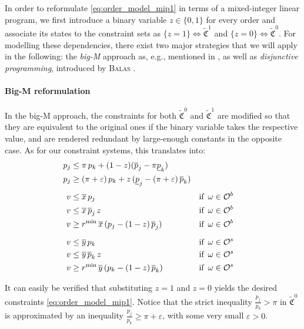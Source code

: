 \documentclass[11pt,parskip=full]{scrartcl}%
\newcommand*{\eg}{e.g., }
\newcommand*{\Min}{\mathrm{min}}
\newcommand*{\buyorders}{\mathcal{O}^b}     %
\newcommand*{\sellorders}{\mathcal{O}^s}    %
\begin{document}
In order to reformulate \eqref{eq:order_model_mip1} in terms of a mixed-integer linear program,
we first introduce a binary variable $ z \in \{0,1\} $ for every order and associate its states to
the constraint sets as $ \{z = 1\} \Leftrightarrow \tilde{\mathfrak{C}}^1 $ and
$ \{z = 0\} \Leftrightarrow \tilde{\mathfrak{C}}^0 $.
For modelling these dependencies, there exist two major strategies that we will apply in the
following:
the \emph{big-M} approach as, \eg mentioned in \cite{BONAMI-ET-AL_2015:indicator-constraints},
as well as \emph{disjunctive programming}, introduced by \textsc{Balas} \cite{BALAS_1979:DP}.

\paragraph{Big-M reformulation}

In the big-M approach, the constraints for both $ \tilde{\mathfrak{C}}^0 $ and
$ \tilde{\mathfrak{C}}^1 $ are modified so that they are equivalent to the original ones if the
binary variable takes the respective value, and are rendered redundant by large-enough constants in
the opposite case.
As for our constraint systems, this translates into:
\begin{subequations}
\begin{align}
  p_j &\le \pi \, p_k + (1-z) (\overline{p}_j - \pi \underline{p}_k) \\
  p_j &\ge (\pi+\varepsilon) \, p_k
    + z \, (\underline{p}_j - (\pi+\varepsilon) \, \overline{p}_k) \\[1mm]
  v &\le \overline{x} \, p_j
    && \text{if} \enskip \omega \in \buyorders \\
  v &\le \overline{x} \, \overline{p}_j \, z
    && \text{if} \enskip \omega \in \buyorders \\
  v &\ge r^\Min \, \overline{x} \, (p_j - (1-z) \, \overline{p}_j)
    && \text{if} \enskip \omega \in \buyorders \\[2mm]
  v &\le \overline{y} \, p_k
    && \text{if} \enskip \omega \in \sellorders \\
  v &\le \overline{y} \, \overline{p}_k \, z
    && \text{if} \enskip \omega \in \sellorders \\
  v &\ge r^\Min \, \overline{y} \, (p_k - (1-z) \, \overline{p}_k)
    && \text{if} \enskip \omega \in \sellorders
\end{align}
\label{eq:order_model_mip1_bigM}
\end{subequations}

It can easily be verified that substituting $ z=1 $ and $ z=0 $ yields the desired constraints
\eqref{eq:order_model_mip1}.
Notice that the strict inequality $ \frac{p_j}{p_k} > \pi $ in $ \tilde{\mathfrak{C}}^0 $ is
approximated by an inequality $ \frac{p_j}{p_k} \ge \pi + \varepsilon $, with some very small
$ \varepsilon > 0 $.
\end{document}

